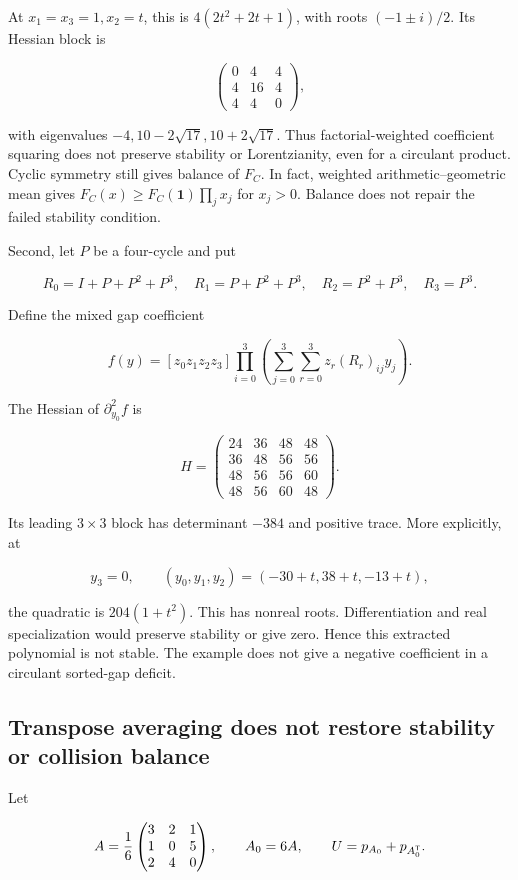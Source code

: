 At \(x_1=x_3=1,x_2=t\), this is \(4(2t^2+2t+1)\), with roots \((-1\pm i)/2\). Its Hessian block is

\[
\begin{pmatrix}0&4&4\\4&16&4\\4&4&0\end{pmatrix},
\]

with eigenvalues \(-4,10-2\sqrt{17},10+2\sqrt{17}\). Thus factorial-weighted coefficient squaring does not preserve stability or Lorentzianity, even for a circulant product. Cyclic symmetry still gives balance of \(F_C\). In fact, weighted arithmetic--geometric mean gives \(F_C(x)\ge F_C(\mathbf1)\prod_jx_j\) for \(x_j>0\). Balance does not repair the failed stability condition.

Second, let \(P\) be a four-cycle and put

\[
R_0=I+P+P^2+P^3,\quad R_1=P+P^2+P^3,\quad
R_2=P^2+P^3,\quad R_3=P^3.
\]

Define the mixed gap coefficient

\[
f(y)=[z_0z_1z_2z_3]
\prod_{i=0}^3\left(\sum_{j=0}^3\sum_{r=0}^3z_r(R_r)_{ij}y_j\right).
\]

The Hessian of \(\partial_{y_0}^2f\) is

\[
H=\begin{pmatrix}
24&36&48&48\\36&48&56&56\\48&56&56&60\\48&56&60&48
\end{pmatrix}.
\]

Its leading \(3\times3\) block has determinant \(-384\) and positive trace. More explicitly, at

\[
y_3=0,\qquad(y_0,y_1,y_2)=(-30+t,38+t,-13+t),
\]

the quadratic is \(204(1+t^2)\). This has nonreal roots. Differentiation and real specialization would preserve stability or give zero. Hence this extracted polynomial is not stable. The example does not give a negative coefficient in a circulant sorted-gap deficit.

\subsection{Transpose averaging does not restore stability or collision balance}\label{app:additional-9}

Let

\[
A=\frac16\begin{pmatrix}3&2&1\\1&0&5\\2&4&0\end{pmatrix},\qquad
A_0=6A,\qquad U=p_{A_0}+p_{A_0^{\mathsf{T}}}.
\]

